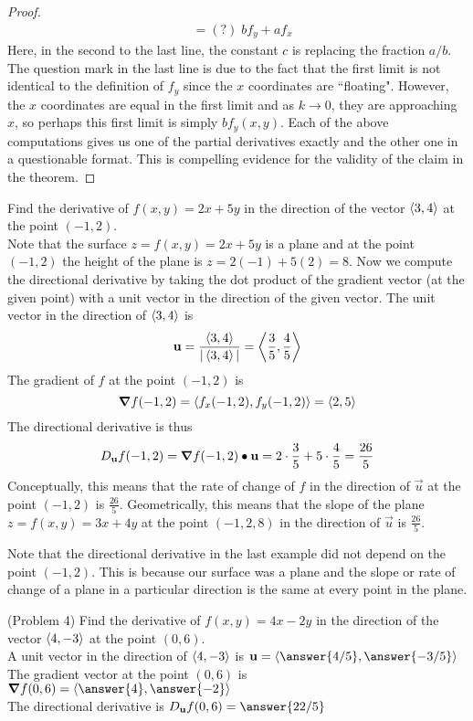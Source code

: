 \documentclass[handout]{ximera}
\begin{document}
\begin{proof}
\begin{align*}
                  &= (?)\;  b f_y + af_x
\end{align*}
Here, in the second to the last line, the constant $c$ is replacing the fraction $a/b$.  
The question mark in the last line is due to the fact that the first limit is not
identical to the definition of $f_y$ since the $x$ coordinates are ``floating".  
However, the $x$ coordinates are equal in the first limit and as $k \to 0$, they are approaching $x$, 
so perhaps this first limit is simply $bf_y(x,y)$.
Each of the above computations gives us one of the partial derivatives exactly and the other one in a questionable format. 
This is compelling evidence for the validity of the claim in the theorem.
\end{proof}


\begin{example}[Example 4]
Find the derivative of $f(x,y) = 2x + 5y$ in the direction of the vector $\left\langle 3,4\right\rangle$ at the point $(-1, 2)$.\\
Note that the surface $z = f(x,y) = 2x + 5y$ is a plane and at the point $(-1, 2)$ the height of the plane is $z = 2(-1) + 5(2) = 8$.
Now we compute the directional derivative by taking the dot product of the gradient vector (at the given point) with a unit 
vector in the direction of the given vector.
The unit vector in the direction of $\left\langle 3,4\right\rangle$ is
\[
\mathbf u = \frac{\left\langle 3,4\right\rangle}{|\left\langle 3,4\right\rangle|} = \left\langle \frac35, \frac45\right\rangle
\]
The gradient of $f$ at the point $(-1, 2)$ is
\[
\boldsymbol\nabla f(-1, 2) = \left\langle f_x(-1,2), f_y(-1,2)\right\rangle = \left\langle 2,5\right\rangle
\]
The directional derivative is thus
\[
D_{\mathbf u} f (-1, 2) = \boldsymbol\nabla f(-1, 2) \bullet \mathbf u = 2 \cdot \frac35 + 5 \cdot \frac45 = \frac{26}{5}
\]
Conceptually, this means that the rate of change of $f$ in the direction of $\vec u$ at the point $(-1, 2)$ is $\frac{26}{5}$.
Geometrically, this means that the slope of the plane $z = f(x,y) = 3x + 4y$ at the 
point $(-1, 2, 8)$ in the direction of $\vec u$ is $\frac{26}{5}$.
\end{example}

\begin{remark}
Note that the directional derivative in the last example did not depend on the point $(-1, 2)$.  
This is because our surface was a plane and the slope or rate of change of a plane in a particular 
direction is the same at every point in the plane.
\end{remark}

\begin{problem}(Problem 4)
Find the derivative of $f(x,y) = 4x - 2y$ in the direction of the vector $\left\langle 4, -3\right\rangle$ at the point $(0, 6)$.\\
A unit vector in the direction of $\left\langle 4, -3\right\rangle$ is $\vec u = \vector{\answer{4/5}, \answer{-3/5}}$\\
The gradient vector at the point $(0,6)$ is $\grad f(0,6) = \vector{\answer{4}, \answer{-2}}$\\
The directional derivative is $D_{\vec u} f(0,6) = \answer{22/5}$
\end{problem}
\end{document}

